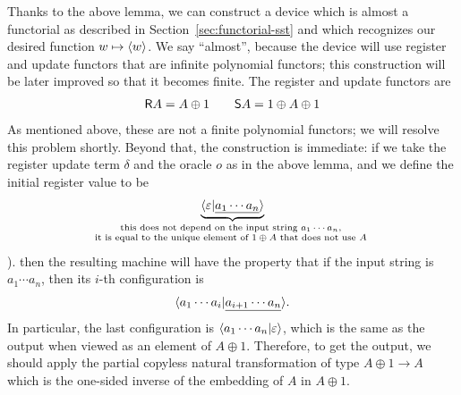 Thanks to the above lemma, we can construct a device which is almost a functorial \sst as described in Section~\ref{sec:functorial-sst} and which recognizes our desired function $w \mapsto \langle w \rangle$. We say ``almost'', because the device will use register and update functors that are  infinite polynomial functors; this construction will be later improved so that it becomes finite.  The register and update functors are 
\begin{align*}
\mathsf R A  = A \oplus 1 \qquad \mathsf S A = 1 \oplus A \oplus 1
\end{align*}
As mentioned above, these are  not a finite polynomial functors; we will resolve this problem shortly. Beyond that, the construction is immediate: if we take the register update term $\delta$ and the oracle $o$ as in the above lemma, and we define the initial register value to be 
\begin{align*}
\myunderbrace{\tuple{\varepsilon | \underline{a_1 \cdots a_n}}}{this does not depend on the input string $a_1 \cdots a_n$, \\ it is equal to the unique element of $1 \oplus A$ that does not use $A$}
\end{align*}).
then the resulting machine will have the property that  if the input string is $a_1 \cdots a_n$, then its $i$-th configuration is 
\begin{align*}
\langle a_1 \cdots a_{i}| \underline{a_{i+1} \cdots a_n} \rangle.
\end{align*}
In particular, the last configuration is $\langle a_1 \cdots a_n | \varepsilon \rangle$, which is the same as the output when viewed as an element of $A \oplus 1$. Therefore, to get the output, we should apply the partial copyless natural transformation of type $A \oplus 1 \to A$ which is the one-sided inverse of the embedding of $A$ in $A \oplus 1$.  

